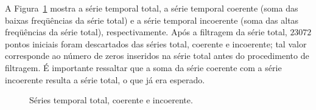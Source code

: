 A Figura~\ref{figfiltrotS0681200} mostra a série temporal total, a série temporal coerente (soma das baixas freqüências da série total) e a série temporal incoerente (soma das altas freqüências da série total), respectivamente. Após a filtragem da série total, $23072$ pontos iniciais foram descartados das séries total, coerente e incoerente; tal valor corresponde ao número de zeros inseridos na série total antes do procedimento de filtragem. É importante ressaltar que a soma da série coerente com a série incoerente resulta a série total, o que já era esperado.

\begin{figure}[ht]
	\caption{Séries temporal total, coerente e incoerente.}
	\vspace{0mm}	%
	\begin{center}
	\end{center}
	\vspace{-2mm}	%
	\label{figfiltrotS0681200}
\end{figure}

